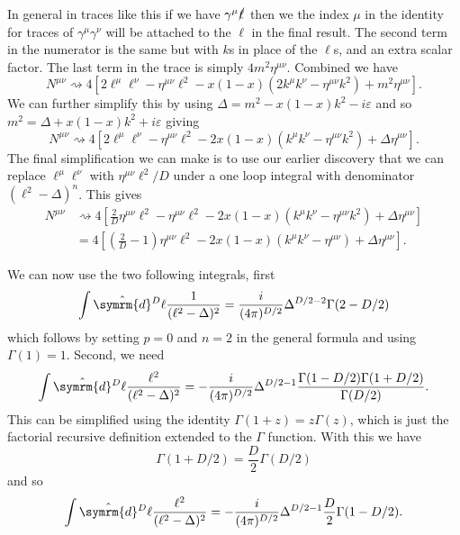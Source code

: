 \documentclass[fleqn]{NotesClass}
\newcommand{\dhat}[1]{\hat{\symrm{d}}{#1}}
\newcommand{\minkowskiMetric}{\eta}
\begin{document}
    In general in traces like this if we have \(\gamma^\mu \slashed{\ell}\) then we the index \(\mu\) in the identity for traces of \(\gamma^\mu \gamma^\nu\) will be attached to the \(\ell\) in the final result.
    The second term in the numerator is the same but with \(k\)s in place of the \(\ell\)s, and an extra scalar factor.
    The last term in the trace is simply \(4m^2\minkowskiMetric^{\mu\nu}\).
    Combined we have
    \begin{equation}
        N^{\mu\nu} \rightsquigarrow 4[2\ell^\mu \ell^\nu - \minkowskiMetric^{\mu\nu}\ell^2 - x(1 - x)(2k^\mu k^\nu - \minkowskiMetric^{\mu\nu} k^2) + m^2\minkowskiMetric^{\mu\nu}].
    \end{equation}
    We can further simplify this by using \(\Delta = m^2 - x(1 - x)k^2 - i\varepsilon\) and so \(m^2 = \Delta + x(1 - x)k^2 + i\varepsilon\) giving
    \begin{equation}
        N^{\mu\nu} \rightsquigarrow 4[2\ell^\mu \ell^\nu - \minkowskiMetric^{\mu\nu}\ell^2 -2x(1 - x)(k^\mu k^\nu - \minkowskiMetric^{\mu\nu}k^2) + \Delta\minkowskiMetric^{\mu\nu}].
    \end{equation}
    The final simplification we can make is to use our earlier discovery that we can replace \(\ell^\mu\ell^\nu\) with \(\minkowskiMetric^{\mu\nu}\ell^2/D\) under a one loop integral with denominator \((\ell^2 - \Delta)^n\).
    This gives
    \begin{align}
        N^{\mu\nu} &\rightsquigarrow 4\left[ \frac{2}{D}\minkowskiMetric^{\mu\nu}\ell^2 - \minkowskiMetric^{\mu\nu}\ell^2 - 2x(1 - x)(k^\mu k^\nu - \minkowskiMetric^{\mu\nu}k^2) + \Delta\minkowskiMetric^{\mu\nu} \right]\\
        &= 4\left[ \left( \frac{2}{D} - 1 \right)\minkowskiMetric^{\mu\nu}\ell^2 - 2x(1 - x)(k^\mu k^\nu - \minkowskiMetric^{\mu\nu}) + \Delta \minkowskiMetric^{\mu\nu} \right].
    \end{align}
    
    We can now use the two following integrals, first
    \begin{equation}
        \int \dhat{^D\ell} \frac{1}{(\ell^2 - \Delta)^2} = \frac{i}{(4\pi)^{D/2}} \Delta^{D/2 - 2}\Gamma(2 - D/2)
    \end{equation}
    which follows by setting \(p = 0\) and \(n = 2\) in the general formula and using \(\Gamma(1) = 1\).
    Second, we need
    \begin{equation}
        \int \dhat{^D\ell} \frac{\ell^2}{(\ell^2 - \Delta)^2} = -\frac{i}{(4\pi)^{D/2}}\Delta^{D/2 - 1} \frac{\Gamma(1 - D/2)\Gamma(1 + D/2)}{\Gamma(D/2)}.
    \end{equation}
    This can be simplified using the identity \(\Gamma(1 + z) = z\Gamma(z)\), which is just the factorial recursive definition extended to the \(\Gamma\) function.
    With this we have
    \begin{equation}
        \Gamma(1 + D/2) = \frac{D}{2}\Gamma(D/2)
    \end{equation}
    and so
    \begin{equation}
        \int \dhat{^D\ell} \frac{\ell^2}{(\ell^2 - \Delta)^2} = -\frac{i}{(4\pi)^{D/2}}\Delta^{D/2 - 1} \frac{D}{2} \Gamma(1 - D/2).
    \end{equation}
    
\end{document}
